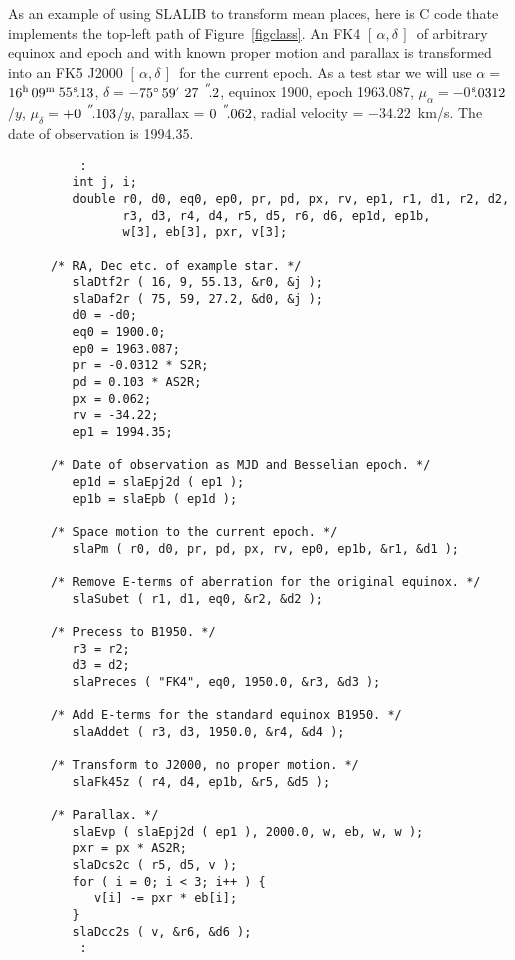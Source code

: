 \documentclass[11pt,fleqn,twoside]{article}
\renewcommand{\_}{{\tt\char'137}}     %
\newcommand{\radec}     {$[\,\alpha,\delta\,]$}
\newcommand{\arcseci}[1] {$#1\hspace{0.05em}$\raisebox{-0.5ex}
                         {$^{'\hspace{-0.1em}'\hspace{0.0em}}$}}
\newcommand{\arcsec}[2] {\arcseci{#1}$\hspace{-0.35em}.#2$}
\newcommand{\dms}[4]    {$#1^{\circ}\,#2\raisebox{-0.5ex}
                        {$^{'}$}\,$\arcsec{#3}{#4}}
\newcommand{\tseci}[1]   {$#1$\mbox{$^{\rm s}$}}
\newcommand{\tsec}[2]    {\tseci{#1}$\hspace{-0.3em}.#2$}
\newcommand{\hms}[4]    {$#1^{\rm h}\,#2^{\rm m}\,$\tsec{#3}{#4}}
\begin{document}
As an example of using SLALIB to transform mean places, here is
C code thate implements the top-left path of Figure~\ref{figclass}.
An FK4 \radec\ of arbitrary equinox and epoch and with
known proper motion and
parallax is transformed into an FK5 J2000 \radec\ for the current
epoch.  As a test star we will use $\alpha=$\hms{16}{09}{55}{13},
$\delta=$\dms{-75}{59}{27}{2}, equinox 1900, epoch 1963.087,
$\mu_\alpha=$\tsec{-0}{0312}$/y$, $\mu_\delta=$\arcsec{+0}{103}$/y$,
parallax = \arcsec{0}{062}, radial velocity = $-34.22$~km/s.  The
date of observation is 1994.35.
\goodbreak
\vspace{-3ex}
\begin{verbatim}
          :
         int j, i;
         double r0, d0, eq0, ep0, pr, pd, px, rv, ep1, r1, d1, r2, d2,
                r3, d3, r4, d4, r5, d5, r6, d6, ep1d, ep1b,
                w[3], eb[3], pxr, v[3];

      /* RA, Dec etc. of example star. */
         slaDtf2r ( 16, 9, 55.13, &r0, &j );
         slaDaf2r ( 75, 59, 27.2, &d0, &j );
         d0 = -d0;
         eq0 = 1900.0;
         ep0 = 1963.087;
         pr = -0.0312 * S2R;
         pd = 0.103 * AS2R;
         px = 0.062;
         rv = -34.22;
         ep1 = 1994.35;

      /* Date of observation as MJD and Besselian epoch. */
         ep1d = slaEpj2d ( ep1 );
         ep1b = slaEpb ( ep1d );

      /* Space motion to the current epoch. */
         slaPm ( r0, d0, pr, pd, px, rv, ep0, ep1b, &r1, &d1 );

      /* Remove E-terms of aberration for the original equinox. */
         slaSubet ( r1, d1, eq0, &r2, &d2 );

      /* Precess to B1950. */
         r3 = r2;
         d3 = d2;
         slaPreces ( "FK4", eq0, 1950.0, &r3, &d3 );

      /* Add E-terms for the standard equinox B1950. */
         slaAddet ( r3, d3, 1950.0, &r4, &d4 );

      /* Transform to J2000, no proper motion. */
         slaFk45z ( r4, d4, ep1b, &r5, &d5 );

      /* Parallax. */
         slaEvp ( slaEpj2d ( ep1 ), 2000.0, w, eb, w, w );
         pxr = px * AS2R;
         slaDcs2c ( r5, d5, v );
         for ( i = 0; i < 3; i++ ) {
            v[i] -= pxr * eb[i];
         }
         slaDcc2s ( v, &r6, &d6 );
          :
\end{verbatim}
\vspace{-3ex}
\goodbreak
\end{document}
